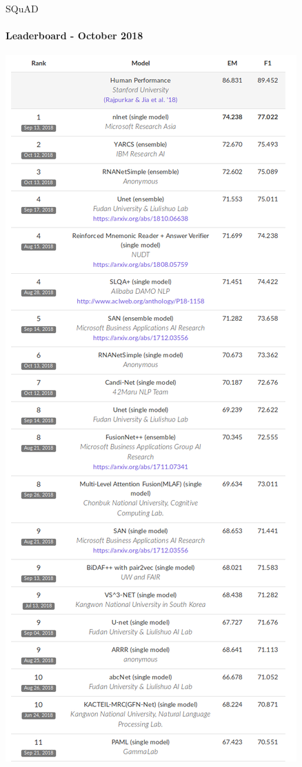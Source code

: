 \documentclass{beamer}
\begin{document}
\begin{frame}{SQuAD}
{
\framesubtitle{Leaderboard - October 2018}
\includegraphics[width=\textwidth]{ml_imgs/squad_oct.png}
}


\end{frame}
\end{document}
